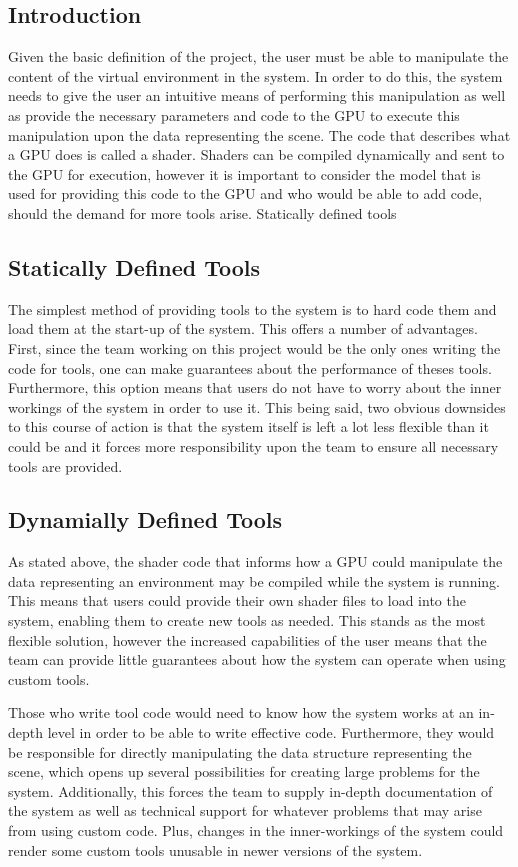 \documentclass[onecolumn, draftclsnofoot,10pt, compsoc]{IEEEtran}
\begin{document}
\subsection{Introduction}
Given the basic definition of the project, the user must be able to manipulate the content of the virtual environment in the system. In order to do this, the system needs to give the user an intuitive means of performing this manipulation as well as provide the necessary parameters and code to the GPU to execute this manipulation upon the data representing the scene. The code that describes what a GPU does is called a shader. Shaders can be compiled dynamically and sent to the GPU for execution, however it is important to consider the model that is used for providing this code to the GPU and who would be able to add code, should the demand for more tools arise. 
Statically defined tools

\subsection{Statically Defined Tools}
The simplest method of providing tools to the system is to hard code them and load them at the start-up of the system. This offers a number of advantages. First, since the team working on this project would be the only ones writing the code for tools, one can make guarantees about the performance of theses tools. Furthermore, this option means that users do not have to worry about the inner workings of the system in order to use it. This being said, two obvious downsides to this course of action is that the system itself is left a lot less flexible than it could be and it forces more responsibility upon the team to ensure all necessary tools are provided.


\subsection{Dynamially Defined Tools}
As stated above, the shader code that informs how a GPU could manipulate the data representing an environment may be compiled while the system is running. This means that users could provide their own shader files to load into the system, enabling them to create new tools as needed. This stands as the most flexible solution, however the increased capabilities of the user means that the team can provide little guarantees about how the system can operate when using custom tools.

Those who write tool code would need to know how the system works at an in-depth level in order to be able to write effective code. Furthermore, they would be responsible for directly manipulating the data structure representing the scene, which opens up several possibilities for creating large problems for the system. Additionally, this forces the team to supply in-depth documentation of the system as well as technical support for whatever problems that may arise from using custom code. Plus, changes in the inner-workings of the system could render some custom tools unusable in newer versions of the system.
\end{document}

